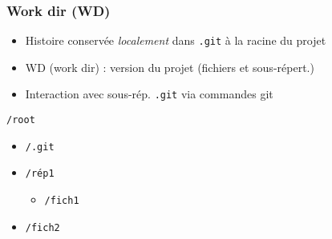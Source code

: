 \documentclass[english, french]{beamer}
\begin{document}
\begin{frame}
	\frametitle{Work dir (WD)}
	\begin{itemize}
		\item Histoire conservée \emph{localement} dans \texttt{.git} à la racine du projet
		\item WD (\og{}work dir\fg{}) : version du projet (fichiers et sous-répert.)
		\item Interaction avec sous-rép. \texttt{.git} via commandes git
	\end{itemize}
	\texttt{/root}
	\begin{itemize}
		\item[] \texttt{/.git}
		\item[] \texttt{/rép1}
		\begin{itemize}
			\item[] \texttt{/fich1}
		\end{itemize}\vspace{-0.8ex}
		\item[] \texttt{/fich2}
	\end{itemize}
\end{frame}
\end{document}

